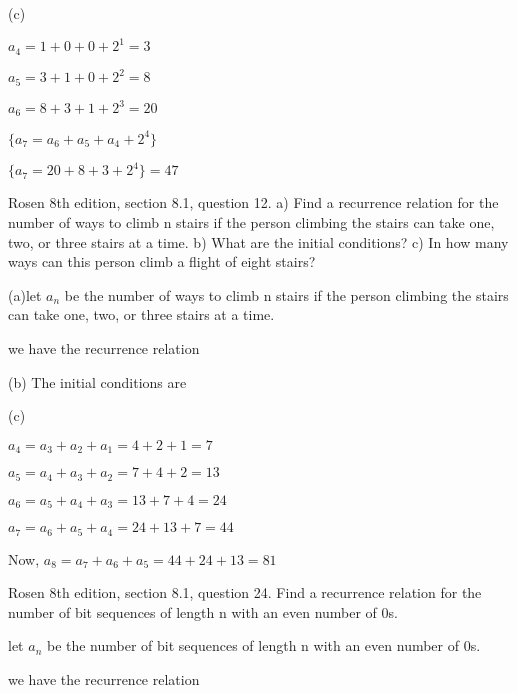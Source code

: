 (c) 

$a_4 = 1 + 0 + 0 + 2^1 = 3$

$a_5 = 3 + 1 + 0 + 2^2 = 8$

$a_6 = 8 + 3 + 1 + 2^3 = 20$

$\{a_7 = a_{6} + a_{5} + a_{4} + 2^{4}\}$

$\{a_7 = 20 + 8 + 3 + 2^{4}\} = 47$


\SOLUTION



\newpage
\nextq Rosen 8th edition, section 8.1, question 12.
a) Find a recurrence relation for the number of ways to
climb n stairs if the person climbing the stairs can take
one, two, or three stairs at a time.
b) What are the initial conditions?
c) In how many ways can this person climb a flight of
eight stairs?

(a)let $a_n$ be the number of ways to
climb n stairs if the person climbing the stairs can take
one, two, or three stairs at a time.

we have the recurrence relation


(b) The initial conditions are 


(c) 

$a_4 = a_{3} + a_{2} + a_{1} = 4 + 2 + 1 = 7$

$a_5 = a_{4} + a_{3} + a_{2} = 7 + 4 + 2 = 13$

$a_6 = a_{5} + a_{4} + a_{3} = 13 + 7 + 4 = 24$

$a_7 = a_{6} + a_{5} + a_{4} = 24 + 13 + 7 = 44$

Now, $a_8 = a_{7} + a_{6} + a_{5} = 44 + 24 + 13 = 81$



\SOLUTION



\newpage
\nextq Rosen 8th edition, section 8.1, question 24.
Find a recurrence relation for the number of bit sequences
of length n with an even number of 0s.

let $a_n $ be the number of bit sequences
of length n with an even number of 0s.

we have the recurrence relation


\SOLUTION



\newpage



